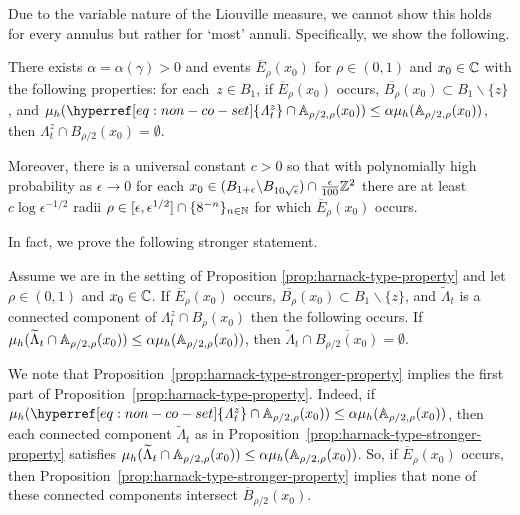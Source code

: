 \documentclass[12pt]{amsart}
\numberwithin{equation}{section}
\newcommand{\cluster}[2]{\hyperref[eq:non-co-set]{\mathit{\Lambda}^{#1}_{#2}}}
\begin{document}
	Due to the variable nature of the Liouville measure, we cannot show this
	holds for every annulus but rather for `most' annuli. 	Specifically, we show the following.
	
	\begin{prop} \label{prop:harnack-type-property}	
		There exists $\alpha = \alpha(\gamma) > 0$ and events
		$\overline E_\rho(x_0)$ for $\rho \in (0,1)$ and $x_0 \in \mathbb{C}$
		with the following properties: for each~$z \in B_{1}$, if $\overline E_\rho(x_0)$ occurs, $\overline{B_{\rho}}(x_0) \subset B_1 \backslash \{z\}$, and $\mu_h({\cluster{z}{t}} \cap \A_{\rho/2, \rho}(x_0)) \leq \alpha \mu_h(\A_{\rho/2, \rho}(x_0))$, then ${\cluster{z}{t}} \cap B_{\rho/2}(x_0) = \emptyset$.
		
		Moreover,  there is a universal constant $c > 0$ so that
		with polynomially high probability as $\epsilon \to 0$ for each $x_0 \in (B_{1 + \epsilon} \backslash B_{10 \sqrt{\epsilon}}) \cap \frac{\epsilon}{100} \mathbb{Z}^2$ there are at least $c \log \epsilon^{-1/2}$ radii $\rho \in [\epsilon, \epsilon^{1/2}] \cap
		\{8^{-n}\}_{n \in \mathbb{N}}$ for which $\overline E_{\rho}(x_0)$ occurs. 
	\end{prop}
	
	
	In fact, we prove the following stronger statement. 
	
	\begin{prop} \label{prop:harnack-type-stronger-property}
		Assume we are in the setting of Proposition \ref{prop:harnack-type-property} and let $\rho \in (0,1)$ and $x_0 \in \mathbb{C}$. If $\overline E_\rho(x_0)$ occurs, $\overline{B_{\rho}}(x_0) \subset B_1 \backslash \{z\}$, and $\widetilde\Lambda_t$ is a connected component of ${\cluster{z}{t}} \cap B_{\rho}(x_0)$ 
		then the following occurs.  If $\mu_h(\widetilde \Lambda_t \cap \mathbb{A}_{\rho/2, \rho}(x_0)) \leq \alpha \mu_h(\mathbb{A}_{\rho/2, \rho}(x_0))$, then $\widetilde \Lambda_t \cap \overline{B_{\rho/2}(x_0)} = \emptyset$. 
	\end{prop}
	
	We note that Proposition~\ref{prop:harnack-type-stronger-property} implies the first part of Proposition~\ref{prop:harnack-type-property}. Indeed, if $\mu_h({\cluster{z}{t}} \cap \A_{\rho/2, \rho}(x_0)) \leq \alpha \mu_h(\A_{\rho/2, \rho}(x_0))$, then each connected component $\widetilde\Lambda_t$ as in Proposition~\ref{prop:harnack-type-stronger-property} satisfies $\mu_h(\widetilde \Lambda_t \cap \mathbb{A}_{\rho/2, \rho}(x_0)) \leq \alpha \mu_h(\mathbb{A}_{\rho/2, \rho}(x_0))$. So, if $\overline E_\rho(x_0)$ occurs, then Proposition~\ref{prop:harnack-type-stronger-property} implies that none of these connected components intersect $\overline B_{\rho/2}(x_0)$.  
	
\end{document}
